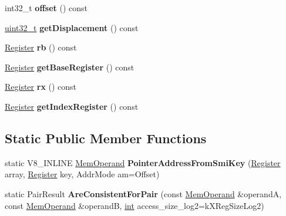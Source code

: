 \begin{DoxyCompactItemize}
int32\+\_\+t {\bfseries offset} () const
\item 
\mbox{\label{classv8_1_1internal_1_1MemOperand_af3e5746cc15bf2ed5daa3cd0eef8a645}} 
\mbox{\hyperlink{classuint32__t}{uint32\+\_\+t}} {\bfseries get\+Displacement} () const
\item 
\mbox{\label{classv8_1_1internal_1_1MemOperand_a497c30ce37c5a313619a05f5eef7b80b}} 
\mbox{\hyperlink{classv8_1_1internal_1_1Register}{Register}} {\bfseries rb} () const
\item 
\mbox{\label{classv8_1_1internal_1_1MemOperand_a2c25cc7a3a736ec760fa79c2243ccf2d}} 
\mbox{\hyperlink{classv8_1_1internal_1_1Register}{Register}} {\bfseries get\+Base\+Register} () const
\item 
\mbox{\label{classv8_1_1internal_1_1MemOperand_affeb222c1ee2ba39ca124239420ce4e7}} 
\mbox{\hyperlink{classv8_1_1internal_1_1Register}{Register}} {\bfseries rx} () const
\item 
\mbox{\label{classv8_1_1internal_1_1MemOperand_a4f16ad7e751f20f47d8953f4125fb1cb}} 
\mbox{\hyperlink{classv8_1_1internal_1_1Register}{Register}} {\bfseries get\+Index\+Register} () const
\end{DoxyCompactItemize}
\subsection*{Static Public Member Functions}
\begin{DoxyCompactItemize}
\item 
\mbox{\label{classv8_1_1internal_1_1MemOperand_adb75ae517082c386ce4aa416ee944e84}} 
static V8\+\_\+\+I\+N\+L\+I\+NE \mbox{\hyperlink{classv8_1_1internal_1_1MemOperand}{Mem\+Operand}} {\bfseries Pointer\+Address\+From\+Smi\+Key} (\mbox{\hyperlink{classv8_1_1internal_1_1Register}{Register}} array, \mbox{\hyperlink{classv8_1_1internal_1_1Register}{Register}} key, Addr\+Mode am=Offset)
\item 
\mbox{\label{classv8_1_1internal_1_1MemOperand_ade2082eb65c99187fad7a281b2311849}} 
static Pair\+Result {\bfseries Are\+Consistent\+For\+Pair} (const \mbox{\hyperlink{classv8_1_1internal_1_1MemOperand}{Mem\+Operand}} \&operandA, const \mbox{\hyperlink{classv8_1_1internal_1_1MemOperand}{Mem\+Operand}} \&operandB, \mbox{\hyperlink{classint}{int}} access\+\_\+size\+\_\+log2=k\+X\+Reg\+Size\+Log2)
\end{DoxyCompactItemize}
